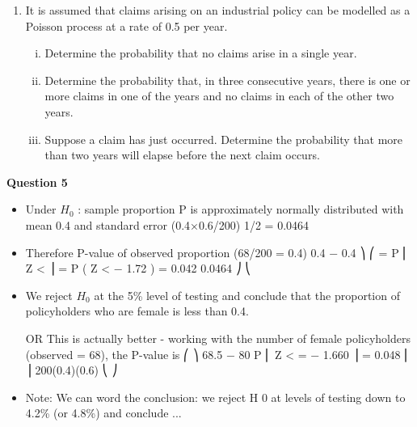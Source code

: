 \documentclass[a4paper,12pt]{article}
\begin{document}
\begin{enumerate}
\item 

It is assumed that claims arising on an industrial policy can be modelled as a Poisson process at a rate of 0.5 per year.

\begin{enumerate}[(i)]
\item Determine the probability that no claims arise in a single year.

\item Determine the probability that, in three consecutive years, there is one or more
claims in one of the years and no claims in each of the other two years.

\item Suppose a claim has just occurred. Determine the probability that more than
two years will elapse before the next claim occurs.
\end{enumerate}

\end{enumerate}
\newpage


\noindent \textbf{Question 5}
\begin{itemize}
\item Under $H_0$ : sample proportion P is approximately normally distributed with mean 0.4 and standard error (0.4×0.6/200) 1/2 = 0.0464
\item Therefore P-value of observed proportion (68/200 = 0.4)
0.4 − 0.4 ⎞
⎛
= P ⎜ Z <
⎟ = P ( Z < − 1.72 ) = 0.042
0.0464 ⎠
⎝
\item We reject $H_0$ at the 5\% level of testing and conclude that the proportion of
policyholders who are female is less than 0.4.
\item [OR This is actually better - working with the number of female policyholders
(observed = 68), the P-value is
⎛
⎞
68.5 − 80
P ⎜ Z <
= − 1.660 ⎟ = 0.048
⎜
⎟
200(0.4)(0.6)
⎝
⎠
]
\item Note: We can word the conclusion: we reject H 0 at levels of testing down to 4.2\% (or
4.8\%) and conclude ...
\end{itemize}

\end{document}
